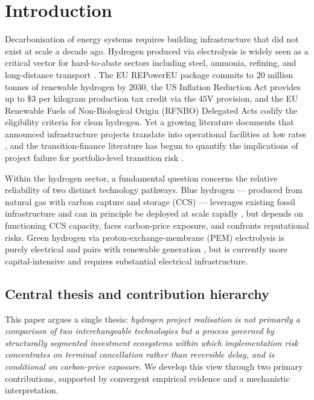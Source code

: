 \documentclass[review,authoryear,11pt]{elsarticle}
\begin{document}
\section{Introduction}

Decarbonisation of energy systems requires building infrastructure that did not exist at scale a decade ago. Hydrogen produced via electrolysis is widely seen as a critical vector for hard-to-abate sectors including steel, ammonia, refining, and long-distance transport \citep{IEA2023, GlenkReichelstein2019}. The EU REPowerEU package \citep{EC2022REPowerEU} commits to 20 million tonnes of renewable hydrogen by 2030, the US Inflation Reduction Act \citep{IRA2022} provides up to \$3 per kilogram production tax credit via the 45V provision, and the EU Renewable Fuels of Non-Biological Origin (RFNBO) Delegated Acts \citep{EC2023RFNBO} codify the eligibility criteria for clean hydrogen. Yet a growing literature documents that announced infrastructure projects translate into operational facilities at low rates \citep{Flyvbjerg2014}, and the transition-finance literature has begun to quantify the implications of project failure for portfolio-level transition risk \citep{Mercure2018, BoltonKacperczyk2021, Caldecott2018}.

Within the hydrogen sector, a fundamental question concerns the relative reliability of two distinct technology pathways. Blue hydrogen --- produced from natural gas with carbon capture and storage (CCS) --- leverages existing fossil infrastructure and can in principle be deployed at scale rapidly \citep{Bui2018, Budinis2018}, but depends on functioning CCS capacity, faces carbon-price exposure, and confronts reputational risks. Green hydrogen via proton-exchange-membrane (PEM) electrolysis is purely electrical and pairs with renewable generation \citep{GlenkReichelstein2019}, but is currently more capital-intensive and requires substantial electrical infrastructure.

\subsection{Central thesis and contribution hierarchy}

This paper argues a single thesis: \textit{hydrogen project realisation is not primarily a comparison of two interchangeable technologies but a process governed by structurally segmented investment ecosystems within which implementation risk concentrates on terminal cancellation rather than reversible delay, and is conditional on carbon-price exposure}. We develop this view through two primary contributions, supported by convergent empirical evidence and a mechanistic interpretation.
\end{document}
